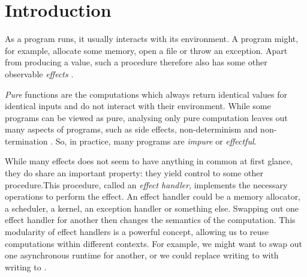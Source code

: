\chapter{Introduction}\label{chap:introduction}


As a program runs, it usually interacts with its environment. A program might, for example, allocate some memory, open a file or throw an exception. Apart from producing a value, such a procedure therefore also has some other observable \emph{effects} \autocite{moggi_computational_1989}.

\emph{Pure} functions are the computations which always return identical values for identical inputs and do not interact with their environment. While some programs can be viewed as pure, analysing only pure computation leaves out many aspects of programs, such as side effects, non-determinism and non-termination \autocite{moggi_computational_1989}. So, in practice, many programs are \emph{impure} or \emph{effectful}.


While many effects does not seem to have anything in common at first glance, they do share an important property: they yield control to some other procedure.\citationneeded This procedure, called an \emph{effect handler}, implements the necessary operations to perform the effect. An effect handler could be a memory allocator, a scheduler, a kernel, an exception handler or something else. Swapping out one effect handler for another then changes the semantics of the computation. This modularity of effect handlers is a powerful concept, allowing us to reuse computations within different contexts. For example, we might want to swap out one asynchronous runtime for another, or we could replace writing to  with writing to .

